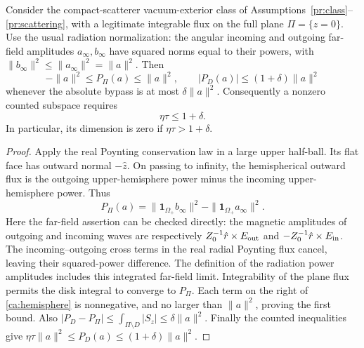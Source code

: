 \begin{proposition}
\label{ca:powerbudget}
Consider the compact-scatterer vacuum-exterior class of
Assumptions~\ref{pr:class}--\ref{pr:scattering}, with a legitimate integrable
flux on the full plane $\Pi=\{z=0\}$.  Use the usual radiation normalization:
the angular incoming and outgoing far-field amplitudes $a_\infty,b_\infty$
have squared norms equal to their powers, with
$\|b_\infty\|^2\leq\|a_\infty\|^2=\|a\|^2$.
Then
\begin{equation}
 -\|a\|^2\leq P_\Pi(a)\leq\|a\|^2,
 \qquad
 |P_D(a)|\leq(1+\delta)\|a\|^2
 \label{ca:powerbudgeteq}
\end{equation}
whenever the absolute bypass is at most $\delta\|a\|^2$.
Consequently a nonzero counted subspace requires
\begin{equation}
 \eta\tau\leq1+\delta.
 \label{ca:thresholdfeasibility}
\end{equation}
In particular, its dimension is zero if $\eta\tau>1+\delta$.
\end{proposition}
\begin{proof}
Apply the real Poynting conservation law in a large upper half-ball.
Its flat face has outward normal $-\hat z$.  On passing to infinity,
the hemispherical outward flux is the outgoing upper-hemisphere power
minus the incoming upper-hemisphere power.  Thus
\begin{equation}
 P_\Pi(a)=\|\mathbf1_{\Omega_+}b_\infty\|^2
          -\|\mathbf1_{\Omega_+}a_\infty\|^2.
 \label{ca:hemisphere}
\end{equation}
Here the far-field assertion can be checked directly: the magnetic
amplitudes of outgoing and incoming waves are respectively
$Z_0^{-1}\hat r\times E_{\rm out}$ and
$-Z_0^{-1}\hat r\times E_{\rm in}$.  The incoming--outgoing cross terms
in the real radial Poynting flux cancel, leaving their squared-power
difference.  The definition of the radiation power amplitudes includes
this integrated far-field limit.  Integrability of the plane flux permits
the disk integral to converge to $P_\Pi$.
Each term on the right of \eqref{ca:hemisphere} is nonnegative, and no
larger than $\|a\|^2$, proving the first bound.  Also
$|P_D-P_\Pi|\leq\int_{\Pi\setminus D}|S_z|\leq\delta\|a\|^2$.
Finally the counted inequalities give
$\eta\tau\|a\|^2\leq P_D(a)\leq(1+\delta)\|a\|^2$.
\end{proof}

